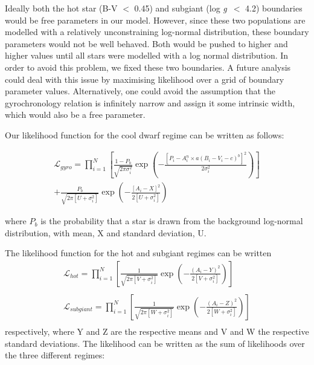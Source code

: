 \documentclass[10pt,preprint]{aastex}
\newcommand{\logg}{log \emph{g}~}
\begin{document}
Ideally both the hot star (B-V $<$ 0.45) and subgiant (\logg $<$ 4.2) boundaries would be free parameters in our model.
However, since these two populations are modelled with a relatively unconstraining log-normal distribution, these boundary parameters would not be well behaved.
Both would be pushed to higher and higher values until all stars were modelled with a log normal distribution.
In order to avoid this problem, we fixed these two boundaries.
A future analysis could deal with this issue by maximising likelihood over a grid of boundary parameter values.
Alternatively, one could avoid the assumption that the gyrochronology relation is infinitely narrow and assign it some intrinsic width, which would also be a free parameter.

Our likelihood function for the cool dwarf regime can be written as follows:


\begin{eqnarray}
	\mathcal{L}_{gyro} = \prod_{i=1}^N \left[ \frac{1-P_b}{\sqrt{2\pi\sigma_{i}^2}}
	\exp\left({-\frac{\left[P_i - A_i^n \times a(B_i-V_i-c)^b\right]^2}{2\sigma_{i}^2}} \right)  \right] \nonumber \\
	+ \frac{P_b}{\sqrt{2\pi[U+\sigma_{i}^2]}} \exp \left( -\frac{[A_i - X]^2}{2[U+\sigma_{i}^2]}  \right)
\end{eqnarray}
\label{eq:likelihood}

where $P_b$ is the probability that a star is drawn from the background log-normal distribution, with mean, X and standard deviation, U.

The likelihood function for the hot and subgiant regimes can be written
\begin{eqnarray}
	\mathcal{L}_{hot} = \prod_{i=1}^N \left[ \frac{1}{\sqrt{2\pi[V+\sigma_{i}^2]}}
	\exp\left({-\frac{\left(A_{i}- Y\right)^2} {2[V+\sigma_{i}^2]}} \right)  \right] \\
	\nonumber \\
	\mathcal{L}_{subgiant} = \prod_{i=1}^N \left[ \frac{1}{\sqrt{2\pi[W+\sigma_{i}^2]}}
	\exp\left({-\frac{\left(A_{i}- Z\right)^2} {2[W+\sigma_{i}^2]}} \right)  \right] \nonumber \\
\end{eqnarray}
respectively, where Y and Z are the respective means and V and W the respective standard deviations.
The likelihood can be written as the sum of likelihoods over the three different regimes:%
\end{document}

